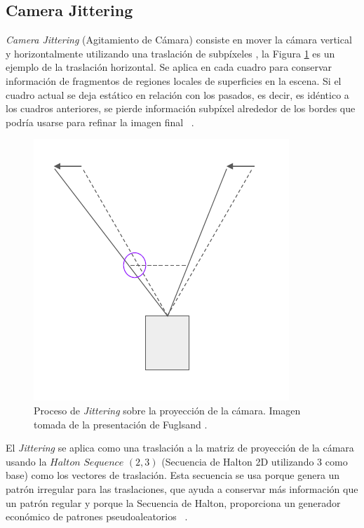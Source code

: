 \documentclass[pregrado]{tesis-usb} %
\begin{document}
\subsection{Camera Jittering}
\textit{Camera Jittering} (Agitamiento de Cámara) consiste en mover la cámara vertical y horizontalmente utilizando una traslación de subpíxeles \cite{Fuglsand2016,XU2016}, la Figura \ref{fig:camerajittering} es un ejemplo de la traslación horizontal. Se aplica en cada cuadro para conservar información de fragmentos de regiones locales de superficies en la escena. Si el cuadro actual se deja estático en relación con los pasados, es decir, es idéntico a los cuadros anteriores, se pierde información subpíxel alrededor de los bordes que podría usarse para refinar la imagen final ~\cite{Fuglsand2016, XU2016}.  

\begin{figure}[!hbt]
	\centering
	\includegraphics[scale=0.3]{images/camera_jitter.png}
	\caption{Proceso de \textit{Jittering} sobre la proyección de la cámara. Imagen tomada de la presentación de Fuglsand \protect\cite{Fuglsand2016}.} \label{fig:camerajittering}
\end{figure}

El \textit{Jittering} se aplica como una traslación a la matriz de proyección de la cámara usando la $Halton$ $Sequence$ $(2,3)$ (Secuencia de Halton 2D utilizando 3 como base) como los vectores de traslación. Esta secuencia se usa porque genera un patrón irregular para las traslaciones, que ayuda a conservar más información que un patrón regular y porque la Secuencia de Halton, proporciona un generador económico de patrones pseudoaleatorios ~\cite{Fuglsand2016, XU2016}. 
\end{document}
